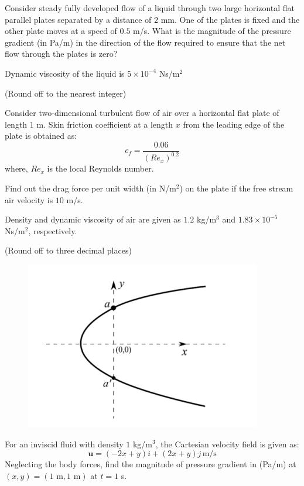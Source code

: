 \item Consider steady fully developed flow of a liquid through two large horizontal flat parallel plates separated by a distance of $2$ mm. One of the plates is fixed and the other plate moves at a speed of $0.5$ m/s. What is the magnitude of the pressure gradient (in Pa/m) in the direction of the flow required to ensure that the net flow through the plates is zero?

Dynamic viscosity of the liquid is $5 \times 10^{-4}$ Ns/m$^2$

(Round off to the nearest integer)
\bigskip

\item Consider two-dimensional turbulent flow of air over a horizontal flat plate of length $1$ m. Skin friction coefficient at a length $x$ from the leading edge of the plate is obtained as:
\[
c_f = \frac{0.06}{\left( Re_x \right)^{0.2}}
\]
where, $Re_x$ is the local Reynolds number.

Find out the drag force per unit width (in N/m$^2$) on the plate if the free stream air velocity is $10$ m/s.

Density and dynamic viscosity of air are given as $1.2$ kg/m$^3$ and $1.83 \times 10^{-5}$ Ns/m$^2$, respectively.

(Round off to three decimal places)
\begin{figure}[h!]
    \centering
    \includegraphics[width=\textwidth]{GATE-yearwise/GATE(11)/figs/fig1.png}
    \caption{}
    \label{fig:fig1}
\end{figure}
\newpage

\item For an inviscid fluid with density $1$ kg/m$^3$, the Cartesian velocity field is given as:
\[
\mathbf{u} = (-2x + y)i + (2x + y)j \, \text{m/s}
\]
Neglecting the body forces, find the magnitude of pressure gradient in (Pa/m) at $(x, y) = (1 \text{ m}, 1 \text{ m})$ at $t = 1$ s.

